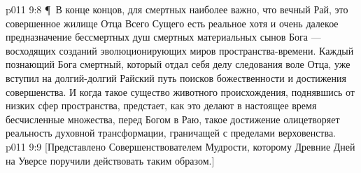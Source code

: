 \vs p011 9:8 \P\ В конце концов, для смертных наиболее важно, что вечный Рай, это совершенное жилище Отца Всего Сущего есть реальное хотя и очень далекое предназначение бессмертных душ смертных материальных сынов Бога --- восходящих созданий эволюционирующих миров пространства\hyp{}времени. Каждый познающий Бога смертный, который отдал себя делу следования воле Отца, уже вступил на долгий\hyp{}долгий Райский путь поисков божественности и достижения совершенства. И когда такое существо животного происхождения, поднявшись от низких сфер пространства, предстает, как это делают в настоящее время бесчисленные множества, перед Богом в Раю, такое достижение олицетворяет реальность духовной трансформации, граничащей с пределами верховенства.
\vs p011 9:9 [Представлено Совершенствователем Мудрости, которому Древние Дней на Уверсе поручили действовать таким образом.]
